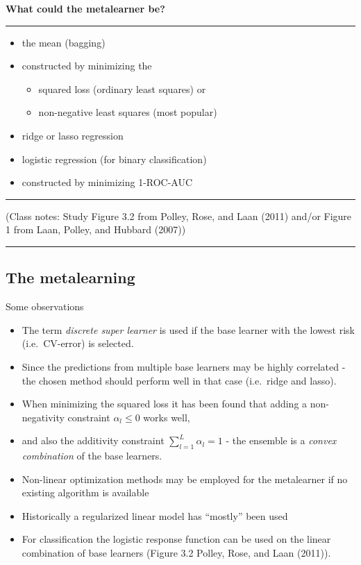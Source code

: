 \documentclass[
  letterpaper,
  DIV=11,
  numbers=noendperiod]{scrartcl}
\providecommand{\tightlist}{%
  \setlength{\itemsep}{0pt}\setlength{\parskip}{0pt}}\usepackage{longtable,booktabs,array}
\begin{document}
\textbf{What could the metalearner be?}

\begin{center}\rule{0.5\linewidth}{0.5pt}\end{center}

\begin{itemize}
\tightlist
\item
  the mean (bagging)
\item
  constructed by minimizing the

  \begin{itemize}
  \tightlist
  \item
    squared loss (ordinary least squares) or
  \item
    non-negative least squares (most popular)
  \end{itemize}
\item
  ridge or lasso regression
\item
  logistic regression (for binary classification)
\item
  constructed by minimizing 1-ROC-AUC
\end{itemize}

\begin{center}\rule{0.5\linewidth}{0.5pt}\end{center}

(Class notes: Study Figure 3.2 from Polley, Rose, and Laan (2011) and/or
Figure 1 from Laan, Polley, and Hubbard (2007))

\begin{center}\rule{0.5\linewidth}{0.5pt}\end{center}

\hypertarget{the-metalearning}{%
\subsection{The metalearning}\label{the-metalearning}}

Some observations

\begin{itemize}
\tightlist
\item
  The term \emph{discrete super learner} is used if the base learner
  with the lowest risk (i.e.~CV-error) is selected.
\item
  Since the predictions from multiple base learners may be highly
  correlated - the chosen method should perform well in that case
  (i.e.~ridge and lasso).
\item
  When minimizing the squared loss it has been found that adding a
  non-negativity constraint \(\alpha_l\le 0\) works well,
\item
  and also the additivity constraint \(\sum_{l=1}^L \alpha_l=1\) - the
  ensemble is a \emph{convex combination} of the base learners.
\item
  Non-linear optimization methods may be employed for the metalearner if
  no existing algorithm is available
\item
  Historically a regularized linear model has ``mostly'' been used
\item
  For classification the logistic response function can be used on the
  linear combination of base learners (Figure 3.2 Polley, Rose, and Laan
  (2011)).
\end{itemize}
\end{document}
